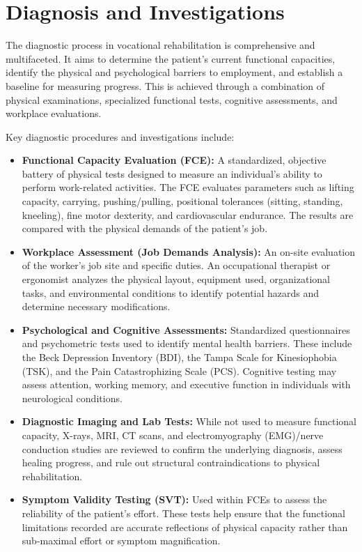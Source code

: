 \section*{Diagnosis and Investigations}
The diagnostic process in vocational rehabilitation is comprehensive and multifaceted. It aims to determine the patient's current functional capacities, identify the physical and psychological barriers to employment, and establish a baseline for measuring progress. This is achieved through a combination of physical examinations, specialized functional tests, cognitive assessments, and workplace evaluations.

Key diagnostic procedures and investigations include:
\begin{itemize}
    \item \textbf{Functional Capacity Evaluation (FCE):} A standardized, objective battery of physical tests designed to measure an individual's ability to perform work-related activities. The FCE evaluates parameters such as lifting capacity, carrying, pushing/pulling, positional tolerances (sitting, standing, kneeling), fine motor dexterity, and cardiovascular endurance. The results are compared with the physical demands of the patient's job.
    \item \textbf{Workplace Assessment (Job Demands Analysis):} An on-site evaluation of the worker's job site and specific duties. An occupational therapist or ergonomist analyzes the physical layout, equipment used, organizational tasks, and environmental conditions to identify potential hazards and determine necessary modifications.
    \item \textbf{Psychological and Cognitive Assessments:} Standardized questionnaires and psychometric tests used to identify mental health barriers. These include the Beck Depression Inventory (BDI), the Tampa Scale for Kinesiophobia (TSK), and the Pain Catastrophizing Scale (PCS). Cognitive testing may assess attention, working memory, and executive function in individuals with neurological conditions.
    \item \textbf{Diagnostic Imaging and Lab Tests:} While not used to measure functional capacity, X-rays, MRI, CT scans, and electromyography (EMG)/nerve conduction studies are reviewed to confirm the underlying diagnosis, assess healing progress, and rule out structural contraindications to physical rehabilitation.
    \item \textbf{Symptom Validity Testing (SVT):} Used within FCEs to assess the reliability of the patient's effort. These tests help ensure that the functional limitations recorded are accurate reflections of physical capacity rather than sub-maximal effort or symptom magnification.
\end{itemize}

